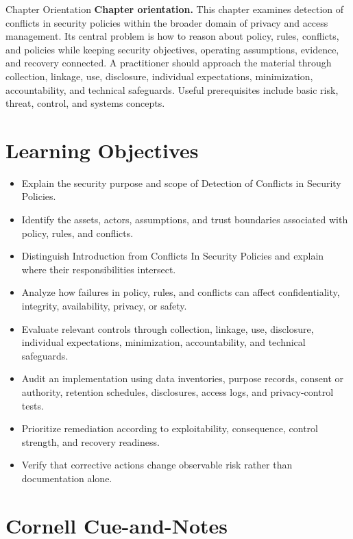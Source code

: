 \documentclass[11pt,letterpaper]{article}
\title{\CornellDocumentTitle}
\author{}
\date{}
\begin{document}
\maketitle
\begin{CornellOverviewBox}{Chapter Orientation}
\textbf{Chapter orientation.} This chapter examines detection of conflicts in security policies within the broader domain of privacy and access management. Its central problem is how to reason about policy, rules, conflicts, and policies while keeping security objectives, operating assumptions, evidence, and recovery connected. A practitioner should approach the material through collection, linkage, use, disclosure, individual expectations, minimization, accountability, and technical safeguards. Useful prerequisites include basic risk, threat, control, and systems concepts.
\end{CornellOverviewBox}
\section*{Learning Objectives}
\begin{itemize}
\item Explain the security purpose and scope of Detection of Conflicts in Security Policies.
\item Identify the assets, actors, assumptions, and trust boundaries associated with policy, rules, and conflicts.
\item Distinguish Introduction from Conflicts In Security Policies and explain where their responsibilities intersect.
\item Analyze how failures in policy, rules, and conflicts can affect confidentiality, integrity, availability, privacy, or safety.
\item Evaluate relevant controls through collection, linkage, use, disclosure, individual expectations, minimization, accountability, and technical safeguards.
\item Audit an implementation using data inventories, purpose records, consent or authority, retention schedules, disclosures, access logs, and privacy-control tests.
\item Prioritize remediation according to exploitability, consequence, control strength, and recovery readiness.
\item Verify that corrective actions change observable risk rather than documentation alone.
\end{itemize}
\section*{Cornell Cue-and-Notes}
\end{document}
